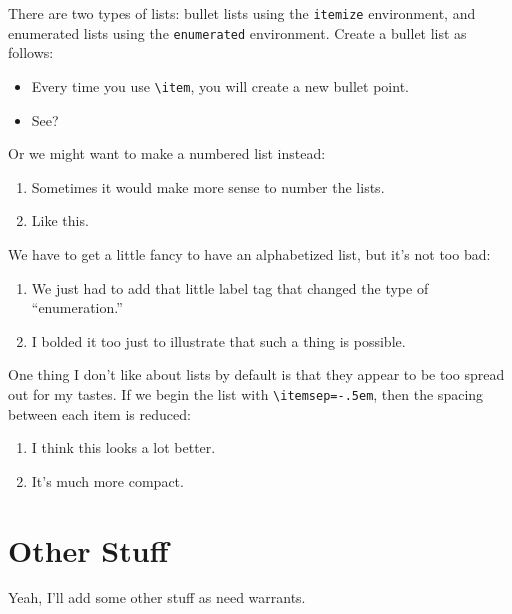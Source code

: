 \documentclass[12pt]{article}
\begin{document}
There are two types of lists: bullet lists using the \verb|itemize| environment, and 
enumerated lists using the \verb|enumerated| environment. Create a bullet list as 
follows:
\begin{itemize}	
	\item Every time you use \verb|\item|, you will create a new bullet point.
	
	\item See?
\end{itemize}
Or we might want to make a numbered list instead:
\begin{enumerate}
	\item Sometimes it would make more sense to number the lists.
	
	\item Like this. 
\end{enumerate}
We have to get a little fancy to have an alphabetized list, but it's not too bad:
\begin{enumerate}[label=\textbf{(\alph*)}]
	\item We just had to add that little label tag that changed the type of ``enumeration.''
	
	\item I bolded it too just to illustrate that such a thing is possible.
\end{enumerate}
One thing I don't like about lists by default is that they appear to be too spread out for 
my tastes. If we begin the list with \verb|\itemsep=-.5em|, then the spacing between each
item is reduced:
\begin{enumerate}[label=\textbf{(\Alph*)}]
	\itemsep-.5em
	\item I think this looks a lot better.	
	\item It's much more compact. 
\end{enumerate}
	
	
	\section{Other Stuff}
	
	Yeah, I'll add some other stuff as need warrants. 
 
	
\end{document}
